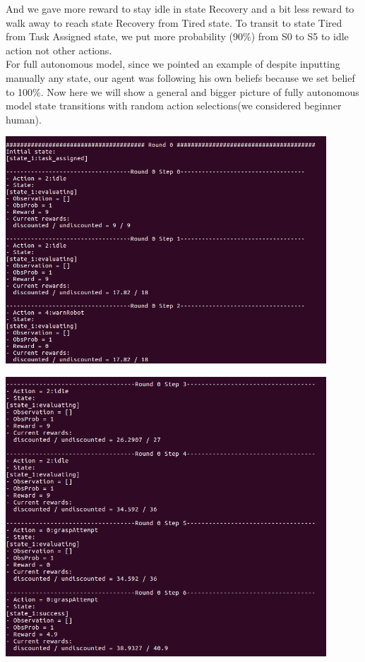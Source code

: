 And we gave more reward to stay idle in state Recovery and a bit less reward to walk away to reach state Recovery from Tired state. To transit to state Tired from Task Assigned state, we put more probability (90\%) from S0 to S5 to idle action not other actions. \\
For full autonomous model, since we pointed an example of despite inputting manually any state, our agent was following his own beliefs because we set belief to 100\%. Now here we will show a general and bigger picture of fully autonomous model state transitions with random action selections(we considered beginner human).

\begin{minipage}{0.8\textwidth}
\centering
	\includegraphics[width=12cm]{Pictures/func/MDP/MDP11.png}
	\label{fig:MDP11}
\end{minipage}

\begin{minipage}{0.8\textwidth}
\centering
	\includegraphics[width=12cm]{Pictures/func/MDP/MDP12.png}
	\label{fig:MDP12}
\end{minipage}

